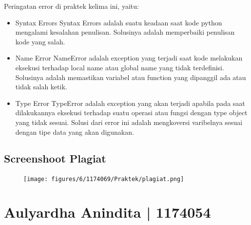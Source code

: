 \hfill \break
Peringatan error di praktek kelima ini, yaitu:
\begin{itemize}
	\item Syntax Errors
	Syntax Errors adalah suatu keadaan saat kode python mengalami kesalahan penulisan. Solusinya adalah memperbaiki penulisan kode yang salah.
	
	\item Name Error
	NameError adalah exception yang terjadi saat kode melakukan eksekusi terhadap local name atau global name yang tidak terdefinisi. Solusinya adalah memastikan variabel atau function yang dipanggil ada atau tidak salah ketik.
	
	\item Type Error
	TypeError adalah exception yang akan terjadi apabila pada saat dilakukannya eksekusi terhadap suatu operasi atau fungsi dengan type object yang tidak sesuai. Solusi dari error ini adalah mengkoversi varibelnya sesuai dengan tipe data yang akan digunakan.
\end{itemize}



\subsection{Screenshoot Plagiat}
\begin{figure}[H]
	\texttt{[image: figures/6/1174069/Praktek/plagiat.png]}
	\centering
\end{figure}


\section{Aulyardha Anindita | 1174054}
